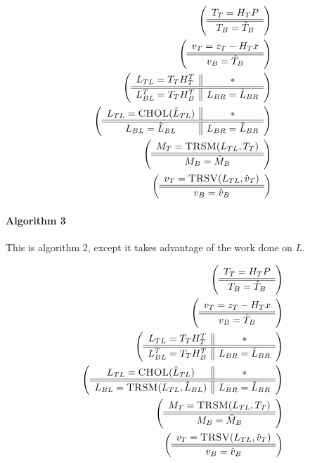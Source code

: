 \documentclass[12pt,letterpaper]{article}
\begin{document}
\begin{align*}
  \left( \begin{array}{c} T_T = H_TP \\ \hline \hline T_B = \hat{T}_B \end{array} \right)\\
  \left( \begin{array}{c} v_T = z_T - H_Tx \\ \hline \hline v_B = \hat{T}_B \end{array} \right)\\
  \left( \begin{array}{c || c} L_{TL} = T_TH^T_T & * \\ \hline \hline L_{BL}^T = T_TH_B^T & L_{BR} = \hat{L}_{BR} \end{array} \right)\\
  \left( \begin{array}{c || c} L_{TL} = \textsc{CHOL}(\hat{L}_{TL}) & * \\ \hline \hline L_{BL} = \hat{L}_{BL} & L_{BR} = \hat{L}_{BR} \end{array} \right)\\
  \left( \begin{array}{c} M_T = \textsc{TRSM}(L_{TL}, T_T) \\ \hline \hline M_B = \hat{M}_B \end{array} \right)\\
  \left( \begin{array}{c} v_T = \textsc{TRSV}(L_{TL}, \hat{v}_T) \\ \hline \hline v_B = \hat{v}_B \end{array} \right)\\
\end{align*}

\paragraph{Algorithm 3}
This is algorithm 2, except it takes advantage of the work done on $L$.

\begin{align*}
  \left( \begin{array}{c} T_T = H_TP \\ \hline \hline T_B = \hat{T}_B \end{array} \right)\\
  \left( \begin{array}{c} v_T = z_T - H_Tx \\ \hline \hline v_B = \hat{T}_B \end{array} \right)\\
  \left( \begin{array}{c || c} L_{TL} = T_TH^T_T & * \\ \hline \hline L_{BL}^T = T_TH_B^T & L_{BR} = \hat{L}_{BR} \end{array} \right)\\
  \left( \begin{array}{c || c} L_{TL} = \textsc{CHOL}(\hat{L}_{TL}) & * \\ \hline \hline L_{BL} = \textsc{TRSM}(L_{TL}, \hat{L}_{BL}) & L_{BR} = \hat{L}_{BR} \end{array} \right)\\
  \left( \begin{array}{c} M_T = \textsc{TRSM}(L_{TL}, T_T) \\ \hline \hline M_B = \hat{M}_B \end{array} \right)\\
  \left( \begin{array}{c} v_T = \textsc{TRSV}(L_{TL}, \hat{v}_T) \\ \hline \hline v_B = \hat{v}_B \end{array} \right)\\
\end{align*}
\end{document}
